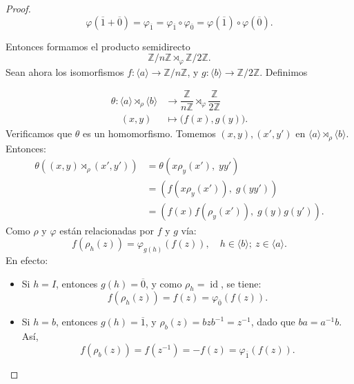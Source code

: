 \begin{proof}
	$$\varphi(\overline{1}+\overline{0})=\varphi_{\overline{1}}=\varphi_{\overline{1}}\circ \varphi_{\overline{0}}=\varphi\left(\overline{1}\right)\circ \varphi\left(\overline{0}\right).$$
	
	
	\medskip
	\noindent
	Entonces formamos el producto semidirecto
	\[
	\mathbb{Z}/n\mathbb{Z} \rtimes_{\varphi} \mathbb{Z}/2\mathbb{Z}.
	\]
	Sean ahora los isomorfismos \(f: \langle a \rangle \to \mathbb{Z}/n\mathbb{Z}\), y \(g: \langle b \rangle \to \mathbb{Z}/2\mathbb{Z}\). Definimos
	
	\begin{align*}
		\theta: \langle a\rangle\rtimes_{\rho} \langle b \rangle&\longrightarrow \dfrac{\mathbb{Z}}{n\mathbb{Z}} \rtimes_{\varphi} \dfrac{\mathbb{Z}}{2\mathbb{Z}} \\[5pt]
		\quad (x, y) &\longmapsto \big(f(x), g(y)\big).
	\end{align*}
	Verificamos que \(\theta\) es un homomorfismo. Tomemos \((x,y), (x', y')\) en \(\langle a\rangle \rtimes_{\rho} \langle b\rangle\). Entonces:
	\begin{align*}
		\theta((x,y)\rtimes_{\rho}(x',y')) 
		&= \theta\left(x  \rho_{y}(x'),\; yy'\right) \\
		&= \left(f(x  \rho_{y}(x')),\; g(yy')\right) \\
		&= \left(f(x) f(\rho_{y}(x')),\; g(y) g(y')\right).
	\end{align*}
	Como \(\rho\) y \(\varphi\) están relacionadas por \(f\) y \(g\) vía:
	\[
	f(\rho_h(z)) = \varphi_{g(h)}(f(z)),\quad h\in \langle b\rangle; \: z\in \langle a\rangle.
	\]
En efecto:
	\begin{itemize}
		\item Si \(h = I\), entonces \(g(h) = \overline{0}\), y como \(\rho_h = \operatorname{id}\), se tiene:
		\[
		f(\rho_h(z)) = f(z) = \varphi_{\overline{0}}(f(z)).
		\]
		\item Si \(h = b\), entonces \(g(h) = \overline{1}\), y \(\rho_b(z) = bzb^{-1} = z^{-1}\), dado que  \(ba = a^{-1}b\). Así,
		\[
		f(\rho_b(z)) = f(z^{-1}) = -f(z) = \varphi_{\overline{1}}(f(z)).
		\]
		

\end{itemize}
\end{proof}
